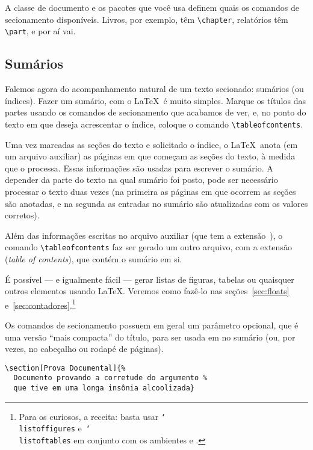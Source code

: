 A classe de documento e os pacotes que você usa definem quais os
comandos de secionamento disponíveis. Livros, por exemplo, têm
\verb'\chapter', relatórios têm \verb'\part', e por aí vai.

\subsection{Sumários}

Falemos agora do acompanhamento natural de um texto secionado:
sumários (ou índices). Fazer um sumário, com o
\LaTeX\ é muito simples. Marque os títulos das partes usando os comandos de
secionamento que acabamos de ver, e, no ponto do texto em que deseja
acrescentar o índice, coloque o comando \verb'\tableofcontents'.

Uma vez marcadas as seções do texto e solicitado o índice, o
\LaTeX\ anota (em um arquivo auxiliar) as páginas em que começam as
seções do texto, à medida que o processa. Essas informações
são usadas para escrever o sumário. A depender da parte do
texto na qual sumário foi posto, pode ser necessário processar o texto duas
vezes (na primeira as páginas em que ocorrem as seções são anotadas, e
na segunda as entradas no sumário são atualizadas com os valores
corretos).

Além das informações escritas no arquivo auxiliar (que tem a
extensão~), o comando \verb'\tableofcontents' faz ser
gerado um outro arquivo, com a extensão  (\emph{table of
  contents}), que contém o sumário em si. 

É possível --- e igualmente fácil --- gerar listas de figuras, tabelas
ou quaisquer outros elementos usando \LaTeX. Veremos como fazê-lo nas
seções~\ref{sec:floats} e~\ref{sec:contadores}.\footnote{Para os
  curiosos, a receita: basta usar  \texttt{\char`\\{}listoffigures}
  e~\texttt{\char`\\{}listoftables} em conjunto com os ambientes
   e .}


Os comandos de secionamento possuem em geral um parâmetro opcional,
que é uma versão ``mais compacta'' do título, para ser usada em no
sumário (ou, por vezes, no cabeçalho ou rodapé de páginas).
\begin{footnotesize}
\begin{verbatim}
\section[Prova Documental]{%
  Documento provando a corretude do argumento %
  que tive em uma longa insônia alcoolizada}
\end{verbatim}
\end{footnotesize}


